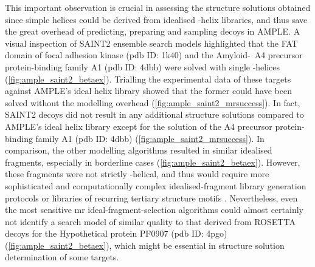 This important observation is crucial in assessing the structure solutions obtained since simple helices could be derived from idealised \textalpha-helix libraries, and thus save the great overhead of predicting, preparing and sampling decoys in AMPLE. A visual inspection of SAINT2 ensemble search models highlighted that the FAT domain of focal adhesion kinase (\gls{pdb} ID: 1k40) and the Amyloid-\textbeta\ A4 precursor protein-binding family A1 (\gls{pdb} ID: 4dbb) were solved with single \textalpha-helices (\cref{fig:ample_saint2_betaex}). Trialling the experimental data of these targets against AMPLE's ideal helix library \cite{Thomas2015-wu} showed that the former could have been solved without the modelling overhead (\cref{fig:ample_saint2_mrsuccess}). In fact, SAINT2 decoys did not result in any additional structure solutions compared to AMPLE's ideal helix library except for the solution of the A4 precursor protein-binding family A1 (\gls{pdb} ID: 4dbb) (\cref{fig:ample_saint2_mrsuccess}). In comparison, the other modelling algorithms resulted in similar idealised fragments, especially in borderline cases (\cref{fig:ample_saint2_betaex}). However, these fragments were not strictly \textalpha-helical, and thus would require more sophisticated and computationally complex idealised-fragment library generation protocols \cite[e.g.,][]{Jenkins2018-gf} or libraries of recurring tertiary structure motifs \cite[e.g.,][]{Sammito2013-ug}. Nevertheless, even the most sensitive \gls{mr} ideal-fragment-selection algorithms could almost certainly not identify a search model of similar quality to that derived from ROSETTA decoys for the Hypothetical protein PF0907 (\gls{pdb} ID: 4pgo) (\cref{fig:ample_saint2_betaex}), which might be essential in structure solution determination of some targets.


